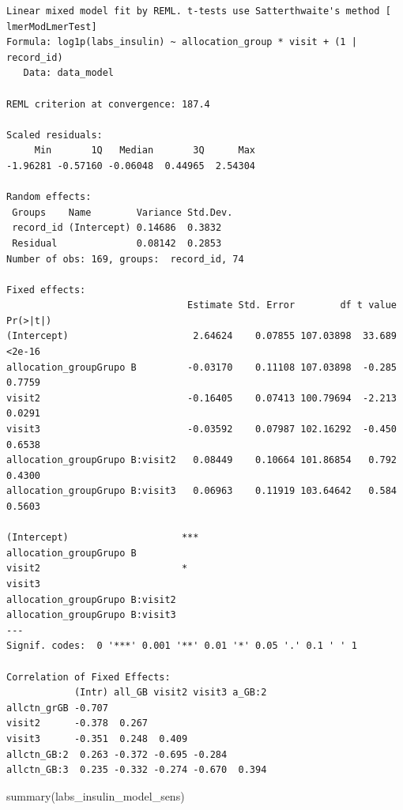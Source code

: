 \documentclass[
  letterpaper,
  DIV=11,
  numbers=noendperiod]{scrartcl}
\newenvironment{Shaded}{\begin{snugshade}}{\end{snugshade}}
\newcommand{\FunctionTok}[1]{\textcolor[rgb]{0.28,0.35,0.67}{#1}}
\newcommand{\NormalTok}[1]{\textcolor[rgb]{0.00,0.23,0.31}{#1}}
\begin{document}
\begin{verbatim}
Linear mixed model fit by REML. t-tests use Satterthwaite's method [
lmerModLmerTest]
Formula: log1p(labs_insulin) ~ allocation_group * visit + (1 | record_id)
   Data: data_model

REML criterion at convergence: 187.4

Scaled residuals: 
     Min       1Q   Median       3Q      Max 
-1.96281 -0.57160 -0.06048  0.44965  2.54304 

Random effects:
 Groups    Name        Variance Std.Dev.
 record_id (Intercept) 0.14686  0.3832  
 Residual              0.08142  0.2853  
Number of obs: 169, groups:  record_id, 74

Fixed effects:
                                Estimate Std. Error        df t value Pr(>|t|)
(Intercept)                      2.64624    0.07855 107.03898  33.689   <2e-16
allocation_groupGrupo B         -0.03170    0.11108 107.03898  -0.285   0.7759
visit2                          -0.16405    0.07413 100.79694  -2.213   0.0291
visit3                          -0.03592    0.07987 102.16292  -0.450   0.6538
allocation_groupGrupo B:visit2   0.08449    0.10664 101.86854   0.792   0.4300
allocation_groupGrupo B:visit3   0.06963    0.11919 103.64642   0.584   0.5603
                                  
(Intercept)                    ***
allocation_groupGrupo B           
visit2                         *  
visit3                            
allocation_groupGrupo B:visit2    
allocation_groupGrupo B:visit3    
---
Signif. codes:  0 '***' 0.001 '**' 0.01 '*' 0.05 '.' 0.1 ' ' 1

Correlation of Fixed Effects:
            (Intr) all_GB visit2 visit3 a_GB:2
allctn_grGB -0.707                            
visit2      -0.378  0.267                     
visit3      -0.351  0.248  0.409              
allctn_GB:2  0.263 -0.372 -0.695 -0.284       
allctn_GB:3  0.235 -0.332 -0.274 -0.670  0.394
\end{verbatim}

\begin{Shaded}
\begin{Highlighting}[]
\FunctionTok{summary}\NormalTok{(labs\_insulin\_model\_sens)}
\end{Highlighting}
\end{Shaded}
\end{document}
